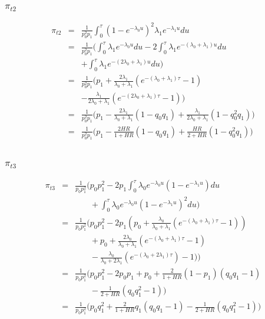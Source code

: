 \documentclass[xcolor=pdftex,dvipsnames,table]{beamer}
\begin{document}
\begin{frame} %
\frametitle{$\pi_{t2}$}
\begin{eqnarray*} 
\pi_{t2} & = & \frac{1}{p_0^2 p_1}\int_0^\tau (1 - e^{-\lambda_0 u})^2 \lambda_1 e^{-\lambda_1 u} du \\
& = & \frac{1}{p_0^2 p_1}\Big( \int_0^\tau \lambda_1 e^{-\lambda_0 u} du - 2 \int_0^\tau \lambda_1 e^{-(\lambda_0 + \lambda_1) u} du \\
&   & + \int_0^\tau \lambda_1 e^{-(2\lambda_0 + \lambda_1) u} du\Big) \\
& = & \frac{1}{p_0^2 p_1}\Big(p_1 + \frac{2\lambda_1}{\lambda_0 + \lambda_1} (e^{-(\lambda_0 + \lambda_1)\tau} - 1) \\
&   & - \frac{\lambda_1}{2\lambda_0 + \lambda_1} (e^{-(2\lambda_0 + \lambda_1)\tau} - 1) \Big) \\
& = & \frac{1}{p_0^2 p_1}\Big(p_1 - \frac{2\lambda_1}{\lambda_0 + \lambda_1} (1 - q_0 q_1) + \frac{\lambda_1}{2\lambda_0 + \lambda_1}(1 - q_0^2 q_1) \Big) \\
& = & \frac{1}{p_0^2 p_1}\Big(p_1 - \frac{2 \mathit{HR}}{1 + \mathit{HR}} (1 - q_0 q_1) + \frac{\mathit{HR}}{2 + \mathit{HR}}(1 - q_0^2 q_1) \Big) \\
\\
\end{eqnarray*}
\end{frame}

\begin{frame} %
\frametitle{$\pi_{t3}$}
\begin{eqnarray*} 
\pi_{t3} & = & \frac{1}{p_0 p_1^2}\Big(p_0 p_1^2 - 2 p_1 \int_0^\tau \lambda_0 e^{-\lambda_0 u}(1 - e^{-\lambda_1 u})du \\
&   & \phantom{p_0 p_1^2} + \int_0^\tau \lambda_0 e^{-\lambda_0 u}(1 - e^{-\lambda_1 u})^2du \Big)\\
& = & \frac{1}{p_0 p_1^2}\Big(p_0 p_1^2 - 2p_1(p_0 + \frac{\lambda_0}{\lambda_0 + \lambda_1}(e^{-(\lambda_0 + \lambda_1)\tau} - 1)) \\
&   & \phantom{p_0 p_1^2} + p_0 + \frac{2\lambda_0}{\lambda_0 + \lambda_1}(e^{-(\lambda_0 + \lambda_1)\tau} - 1) \\
&   & \phantom{p_0 p_1^2} - \frac{\lambda_0}{\lambda_0 + 2\lambda_1}(e^{-(\lambda_0 + 2\lambda_1)\tau}) - 1) \Big) \\
& = & \frac{1}{p_0 p_1^2}\Big( p_0 p_1^2 - 2 p_0 p_1 + p_0 + \frac{2}{1 + \mathit{HR}} (1 - p_1) (q_0 q_1 - 1) \\
&   & \phantom{p_0 p_1^2} - \frac{1}{2 + \mathit{HR}}(q_0 q_1^2 - 1) \Big) \\
& = & \frac{1}{p_0 p_1^2}\Big( p_0 q_1^2 + \frac{2}{1 + \mathit{HR}}q_1(q_0 q_1 - 1) - \frac{1}{2 + \mathit{HR}}(q_0 q_1^2 - 1) \Big) \\
\\
\end{eqnarray*}
\end{frame}
\end{document}
